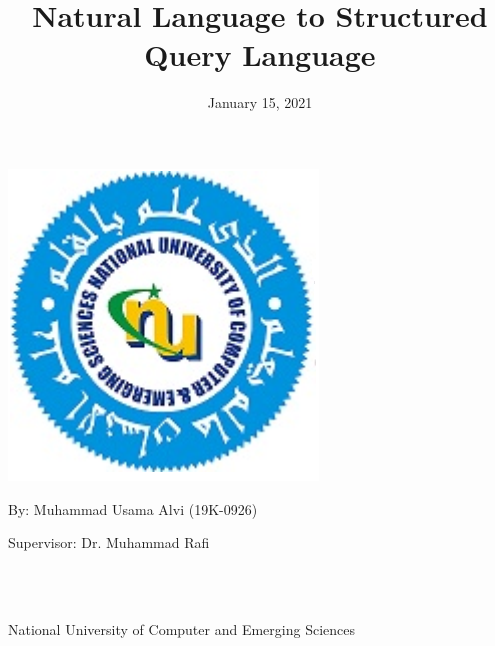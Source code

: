 \documentclass[12pt]{article}
\begin{document}
\title{Natural Language to Structured Query Language}



\date{January 15, 2021}
\maketitle



\begin{center}
    \includegraphics[scale=0.75]{logo}

    \label{fig:Question mark vector}

\end{center}


\centerline{By: Muhammad Usama Alvi (19K-0926)}
\centerline{Supervisor: Dr. Muhammad Rafi}

~\\
~\\

\centerline{National University of Computer and Emerging Sciences}

\newpage




\tableofcontents
\newpage

\listoffigures

\newpage

\listoftables

\newpage
\end{document}
